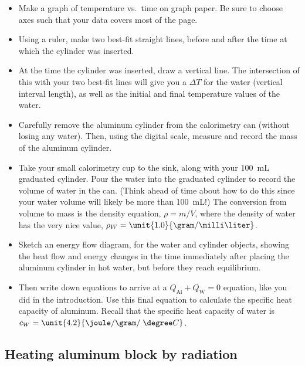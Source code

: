 \begin{itemize}
	\item Make a graph of temperature vs.\ time on graph paper.  Be sure to choose axes such that your data covers most of the page.
	\item Using a ruler, make two best-fit straight lines, before and after the time at which the cylinder was inserted.
	\item At the time the cylinder was inserted, draw a vertical line.  The intersection of this with your two best-fit lines will give you a $\Delta T$ for the water (vertical interval length), as well as the initial and final temperature values of the water.
	\item Carefully remove the aluminum cylinder from the calorimetry can (without losing any water). Then, using the digital scale, measure and record the mass of the aluminum cylinder. 
	\item Take your small calorimetry cup to the sink, along with your 100~mL graduated cylinder.  Pour the water into the graduated cylinder to record the volume of water in the can.  (Think ahead of time about how to do this since your water volume will likely be more than 100~mL!)  The conversion from volume to mass is the density equation, $\rho = m / V$, where the density of water has the very nice value, $\rho_W = \unit{1.0}{\gram/\milli\liter}$.
	\item Sketch an energy flow diagram, for the water and cylinder objects, showing the heat flow and energy changes in the time immediately after placing the aluminum cylinder in hot water, but before they reach equilibrium.
	\item Then write down equations to arrive at a $Q_\text{Al} + Q_\text{W} = 0$ equation, like you did in the introduction. Use this final equation to calculate the specific heat capacity of aluminum. Recall that the specific heat capacity of water is $c_W = \unit{4.2}{\joule/\gram/\;\degree C}$.
	\end{itemize}


\subsection{ Heating aluminum block by radiation}

